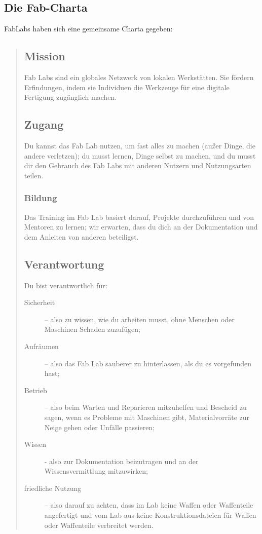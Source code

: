\documentclass[parskip=half,headsepline,footsepline,titlepage]{scrartcl}
\begin{document}
\subsection{Die Fab-Charta}
FabLabs haben sich eine gemeinsame Charta gegeben:
\begin{quote}
\subsection*{Mission}

Fab Labs sind ein globales Netzwerk von lokalen Werkstätten. Sie fördern Erfindungen, indem sie Individuen die Werkzeuge für eine digitale Fertigung zugänglich machen.

\subsection*{Zugang}

Du kannst das Fab Lab nutzen, um fast alles zu machen (außer Dinge, die andere verletzen); du musst lernen, Dinge selbst zu machen, und du musst dir den Gebrauch des Fab Labs mit anderen Nutzern und Nutzungsarten teilen.
\subsubsection*{Bildung}

Das Training im Fab Lab basiert darauf, Projekte durchzuführen und von Mentoren zu lernen; wir erwarten, dass du dich an der Dokumentation und dem Anleiten von anderen beteiligst.

\subsection*{Verantwortung}

Du bist verantwortlich für:
\begin{description}
\item[Sicherheit] – also zu wissen, wie du arbeiten musst, ohne Menschen oder Maschinen Schaden zuzufügen;
\item[Aufräumen] – also das Fab Lab sauberer zu hinterlassen, als du es vorgefunden hast;
\item[Betrieb] – also beim Warten und Reparieren mitzuhelfen und Bescheid zu sagen, wenn es Probleme mit Maschinen gibt, Materialvorräte zur Neige gehen oder Unfälle passieren;
\item[Wissen] - also zur Dokumentation beizutragen und an der Wissensvermittlung mitzuwirken;
\item[friedliche Nutzung] – also darauf zu achten, dass im Lab keine Waffen oder Waffenteile angefertigt und vom Lab aus keine Konstruktionsdateien für Waffen oder Waffenteile verbreitet werden.                                                                                                                                                                                           \end{description}


\end{quote}
\end{document}
